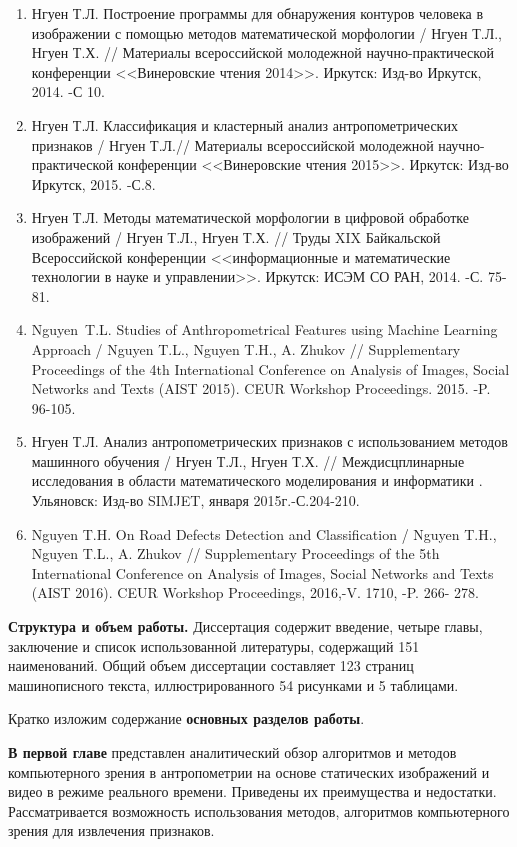 \begin{enumerate}
\item Нгуен Т.Л. Построение программы для обнаружения контуров человека в изображении с помощью методов математической морфологии / Нгуен Т.Л., Нгуен Т.Х. // Материалы всероссийской молодежной научно-практической конференции <<Винеровские чтения 2014>>. Иркутск: Изд-во Иркутск, 2014. -С 10.
\item Нгуен Т.Л. Классификация и кластерный анализ антропометрических признаков / Нгуен Т.Л.// Материалы всероссийской молодежной научно-практической конференции <<Винеровские чтения 2015>>. Иркутск: Изд-во Иркутск, 2015. -С.8.
\item Нгуен Т.Л. Методы математической морфологии в цифровой обработке изображений / Нгуен Т.Л., Нгуен Т.Х. // Труды XIX Байкальской Всероссийской конференции <<информационные и математические технологии в науке и управлении>>. Иркутск: ИСЭМ СО РАН, 2014. -С. 75-81.
\item  Nguyen~T.L. Studies of Anthropometrical Features using Machine Learning Approach / Nguyen T.L., Nguyen T.H., A. Zhukov // Supplementary Proceedings of the 4th International Conference on Analysis of Images, Social Networks and Texts (AIST 2015). CEUR Workshop Proceedings. 2015. -P. 96-105.
\item Нгуен Т.Л. Анализ антропометрических признаков с использованием методов машинного обучения / Нгуен Т.Л., Нгуен Т.Х. // Междисцплинарные исследования в области математического моделирования и информатики . Ульяновск: Изд-во SIMJET, января 2015г.-С.204-210.
\item Nguyen T.H. On Road Defects Detection and Classification / Nguyen T.H., Nguyen T.L., A. Zhukov // Supplementary Proceedings of the 5th International Conference on Analysis of Images, Social Networks and Texts (AIST 2016). CEUR Workshop Proceedings, 2016,-V. 1710, -P. 266- 278.
\end{enumerate}


\textbf{Структура и объем работы.} Диссертация содержит введение, четыре главы, заключение и список использованной литературы, содержащий 151 наименований. Общий объем диссертации составляет 123 страниц машинописного текста, иллюстрированного 54 рисунками и 5 таблицами.

Кратко изложим содержание \textbf{основных разделов работы}.

\textbf{В первой главе} представлен аналитический обзор алгоритмов и методов компьютерного зрения в антропометрии на основе статических изображений и видео в режиме реального времени. Приведены их преимущества и недостатки. Рассматривается возможность использования методов, алгоритмов компьютерного зрения для извлечения признаков.

